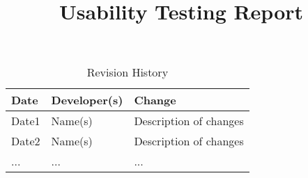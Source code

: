 \documentclass{article}
\title{Usability Testing Report\\\progname}
\author{\authname}
\date{}
\begin{document}
\maketitle

\newpage

\begin{table}[hp]
\caption{Revision History} \label{TblRevisionHistory}
\begin{tabularx}{\textwidth}{llX}
\toprule
\textbf{Date} & \textbf{Developer(s)} & \textbf{Change}\\
\midrule
Date1 & Name(s) & Description of changes\\
Date2 & Name(s) & Description of changes\\
... & ... & ...\\
\bottomrule
\end{tabularx}
\end{table}
\end{document}
